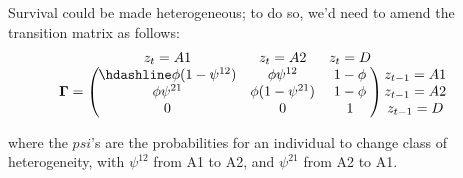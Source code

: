 \documentclass[
  12pt,
]{krantz}
\begin{document}
Survival could be made heterogeneous; to do so, we'd need to amend the transition matrix as follows:
\[\begin{matrix}
& \\
\mathbf{\Gamma} =
  \left ( \vphantom{ \begin{matrix} 12 \\ 12 \\ 12 \end{matrix} } \right .
          \end{matrix}
          \hspace{-1.2em}
          \begin{matrix}
          z_t=A1 & z_t=A2 & z_t=D \\ \hdashline
          \phi (1-\psi^{12}) & \phi \psi^{12} & 1 - \phi\\
          \phi \psi^{21} & \phi (1-\psi^{21}) & 1 - \phi\\
          0 & 0 & 1
          \end{matrix}
          \hspace{-0.2em}
          \begin{matrix}
          & \\
          \left . \vphantom{ \begin{matrix} 12 \\ 12 \\ 12 \end{matrix} } \right )
\begin{matrix}
z_{t-1}=A1 \\ z_{t-1}=A2 \\ z_{t-1}=D
\end{matrix}
\end{matrix}\]

where the \(psi\)'s are the probabilities for an individual to change class of heterogeneity, with \(\psi^{12}\) from A1 to A2, and \(\psi^{21}\) from A2 to A1.
\end{document}
